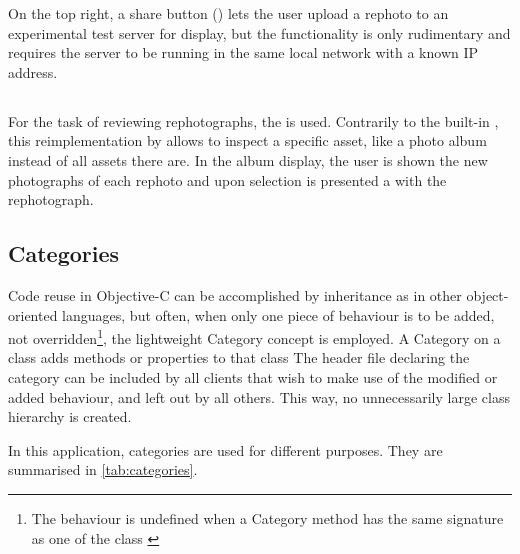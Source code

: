 On the top right, a share button ()
lets the user upload a rephoto to an experimental test server for display, but the
functionality is only rudimentary and requires the server to be running in the
same local network with a known IP address.

\subsection*{}

For the task of reviewing rephotographs, the  is
used. Contrarily to the built-in , this
reimplementation by \citet{nutting2013} allows to inspect a specific asset, like
a photo album instead of all assets there are. In the album display, the user is
shown the new photographs of each rephoto and upon selection is presented a
 with the rephotograph.

\subsection{Categories}

Code reuse in Objective-C can be accomplished by inheritance as in other
object-oriented languages, but often, when only one piece of behaviour is to be
added, not overridden\footnote{The behaviour is undefined when a Category method
has the same signature as one of the class \citep{customizing}}, the
lightweight Category concept is employed. A Category on a class adds methods
or properties to that class The header file declaring the category can be
included by all clients that wish to make use of the modified or added
behaviour, and left out by all others. This way, no unnecessarily large class
hierarchy is created.

In this application, categories are used for different purposes. They are
summarised in \autoref{tab:categories}.

